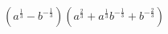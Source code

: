 $(a^{\frac{1}{3}}-b^{-\frac{1}{3}})(a^{\frac{2}{3}}+a^{\frac{1}{3}}b^{-\frac{1}{3}}+b^{-\frac{2}{3}})$
